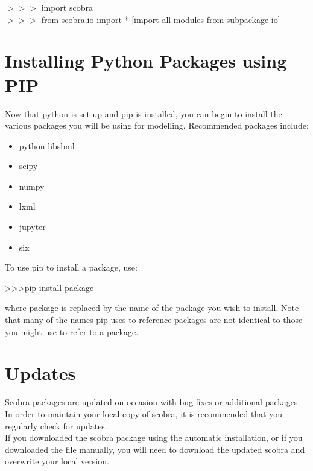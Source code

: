 \begin{framed}
$>>>$ import scobra\\
$>>>$ from scobra.io import * [import all modules from subpackage io]
\end{framed}


\section{Installing Python Packages using PIP}

Now that python is set up and pip is installed, you can begin to install the various packages you will be using for modelling. Recommended packages include:

\begin{itemize}
\item python-libsbml
\item scipy
\item numpy
\item lxml
\item jupyter
\item six
\end{itemize}

To use pip to install a package, use:\\

\begin{mdframed}
\textgreater \textgreater \textgreater \quad pip install package
\end{mdframed}

where package is replaced by the name of the package you wish to install. Note that many of the names pip uses to reference packages are not identical to those you might use to refer to a package.


\section{Updates}

Scobra packages are updated on occasion with bug fixes or additional packages. In order to maintain your local copy of scobra, it is recommended that you regularly check for updates.\\

If you downloaded the scobra package using the automatic installation, or if you downloaded the file manually, you will need to download the updated scobra and overwrite your local version.\\

